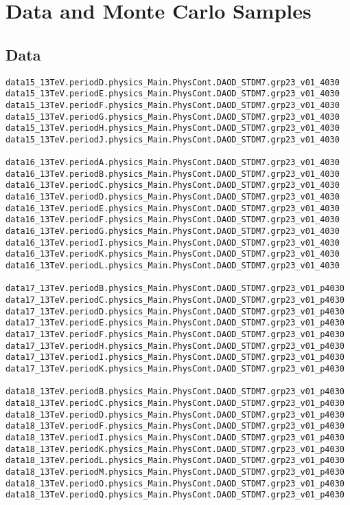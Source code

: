 \section{Data and Monte Carlo Samples}
\label{app:datasets}

\subsection{Data}
\begin{tiny}
\begin{verbatim}
data15_13TeV.periodD.physics_Main.PhysCont.DAOD_STDM7.grp23_v01_4030
data15_13TeV.periodE.physics_Main.PhysCont.DAOD_STDM7.grp23_v01_4030
data15_13TeV.periodF.physics_Main.PhysCont.DAOD_STDM7.grp23_v01_4030
data15_13TeV.periodG.physics_Main.PhysCont.DAOD_STDM7.grp23_v01_4030
data15_13TeV.periodH.physics_Main.PhysCont.DAOD_STDM7.grp23_v01_4030
data15_13TeV.periodJ.physics_Main.PhysCont.DAOD_STDM7.grp23_v01_4030

data16_13TeV.periodA.physics_Main.PhysCont.DAOD_STDM7.grp23_v01_4030
data16_13TeV.periodB.physics_Main.PhysCont.DAOD_STDM7.grp23_v01_4030
data16_13TeV.periodC.physics_Main.PhysCont.DAOD_STDM7.grp23_v01_4030
data16_13TeV.periodD.physics_Main.PhysCont.DAOD_STDM7.grp23_v01_4030
data16_13TeV.periodE.physics_Main.PhysCont.DAOD_STDM7.grp23_v01_4030
data16_13TeV.periodF.physics_Main.PhysCont.DAOD_STDM7.grp23_v01_4030
data16_13TeV.periodG.physics_Main.PhysCont.DAOD_STDM7.grp23_v01_4030
data16_13TeV.periodI.physics_Main.PhysCont.DAOD_STDM7.grp23_v01_4030
data16_13TeV.periodK.physics_Main.PhysCont.DAOD_STDM7.grp23_v01_4030
data16_13TeV.periodL.physics_Main.PhysCont.DAOD_STDM7.grp23_v01_4030

data17_13TeV.periodB.physics_Main.PhysCont.DAOD_STDM7.grp23_v01_p4030
data17_13TeV.periodC.physics_Main.PhysCont.DAOD_STDM7.grp23_v01_p4030
data17_13TeV.periodD.physics_Main.PhysCont.DAOD_STDM7.grp23_v01_p4030
data17_13TeV.periodE.physics_Main.PhysCont.DAOD_STDM7.grp23_v01_p4030
data17_13TeV.periodF.physics_Main.PhysCont.DAOD_STDM7.grp23_v01_p4030
data17_13TeV.periodH.physics_Main.PhysCont.DAOD_STDM7.grp23_v01_p4030
data17_13TeV.periodI.physics_Main.PhysCont.DAOD_STDM7.grp23_v01_p4030
data17_13TeV.periodK.physics_Main.PhysCont.DAOD_STDM7.grp23_v01_p4030

data18_13TeV.periodB.physics_Main.PhysCont.DAOD_STDM7.grp23_v01_p4030
data18_13TeV.periodC.physics_Main.PhysCont.DAOD_STDM7.grp23_v01_p4030
data18_13TeV.periodD.physics_Main.PhysCont.DAOD_STDM7.grp23_v01_p4030
data18_13TeV.periodF.physics_Main.PhysCont.DAOD_STDM7.grp23_v01_p4030
data18_13TeV.periodI.physics_Main.PhysCont.DAOD_STDM7.grp23_v01_p4030
data18_13TeV.periodK.physics_Main.PhysCont.DAOD_STDM7.grp23_v01_p4030
data18_13TeV.periodL.physics_Main.PhysCont.DAOD_STDM7.grp23_v01_p4030
data18_13TeV.periodM.physics_Main.PhysCont.DAOD_STDM7.grp23_v01_p4030
data18_13TeV.periodO.physics_Main.PhysCont.DAOD_STDM7.grp23_v01_p4030
data18_13TeV.periodQ.physics_Main.PhysCont.DAOD_STDM7.grp23_v01_p4030

\end{verbatim}
\end{tiny}

